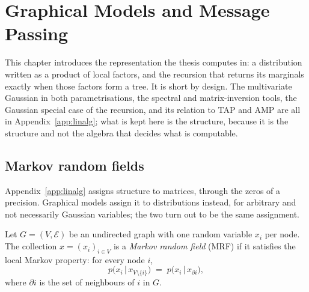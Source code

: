 \chapter{Graphical Models and Message Passing}
\label{ch:graphs}\label{ch:graphical}

This chapter introduces the representation the thesis computes in: a
distribution written as a product of local factors, and the recursion that
returns its marginals exactly when those factors form a tree. It is short by
design. The multivariate Gaussian in both parametrisations, the spectral and
matrix-inversion tools, the Gaussian special case of the recursion, and its
relation to TAP and AMP are all in Appendix~\ref{app:linalg}; what is kept here
is the structure, because it is the structure and not the algebra that decides
what is computable.

\section{Markov random fields}\label{sec:mrf}

Appendix~\ref{app:linalg} assigns structure to matrices, through the zeros of
a precision. Graphical models assign it to distributions instead, for arbitrary
and not necessarily Gaussian variables; the two turn out to be the same
assignment.

\begin{definition}
Let $G = (V, \mathcal{E})$ be an undirected graph with one random
variable $x_i$ per node. The collection $x = (x_i)_{i \in V}$ is a
\emph{Markov random field} (MRF) if it satisfies the local Markov
property: for every node $i$,
\begin{equation}
  p\big(x_i \,\big|\, x_{V \setminus \{i\}}\big)
  \;=\; p\big(x_i \,\big|\, x_{\partial i}\big),
  \label{eq:local-markov}
\end{equation}
where $\partial i$ is the set of neighbours of $i$ in $G$.
\end{definition}

